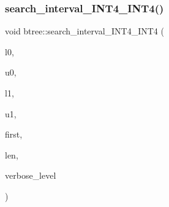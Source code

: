 \subsubsection{\texorpdfstring{search\+\_\+interval\+\_\+\+I\+N\+T4\+\_\+\+I\+N\+T4()}{search\_interval\_INT4\_INT4()}}
{\footnotesize\ttfamily void btree\+::search\+\_\+interval\+\_\+\+I\+N\+T4\+\_\+\+I\+N\+T4 (\begin{DoxyParamCaption}\item[{\mbox{\hyperlink{galois_8h_a09fddde158a3a20bd2dcadb609de11dc}{I\+NT}}}]{l0,  }\item[{\mbox{\hyperlink{galois_8h_a09fddde158a3a20bd2dcadb609de11dc}{I\+NT}}}]{u0,  }\item[{\mbox{\hyperlink{galois_8h_a09fddde158a3a20bd2dcadb609de11dc}{I\+NT}}}]{l1,  }\item[{\mbox{\hyperlink{galois_8h_a09fddde158a3a20bd2dcadb609de11dc}{I\+NT}}}]{u1,  }\item[{\mbox{\hyperlink{galois_8h_a09fddde158a3a20bd2dcadb609de11dc}{I\+NT}} \&}]{first,  }\item[{\mbox{\hyperlink{galois_8h_a09fddde158a3a20bd2dcadb609de11dc}{I\+NT}} \&}]{len,  }\item[{\mbox{\hyperlink{galois_8h_a09fddde158a3a20bd2dcadb609de11dc}{I\+NT}}}]{verbose\+\_\+level }\end{DoxyParamCaption})}

\mbox{\label{classbtree_a8d53c9c59ac02f36c4c25cc0079c8918}} 
